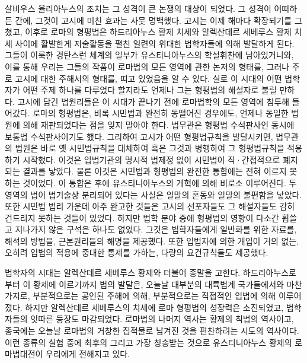 살비우스 율리아누스의 조치는 그 성격이 큰 논쟁의 대상이 되었다.
그 성격이 어떠하든 간에, 그것이 고시에 미친 효과는 사뭇 명백했다.
고시는 이제 해마다 확장되기를 그쳤고, 이후로
로마의 형평법은 하드리아누스 황제 치세와 알렉산데르 세베루스 황제 치세 사이에
활발한게 저술활동을 펼친 일련의 위대한 법학자들에 의해 발달하게 된다.
그들이 이룩한 경탄스런 체계의 일부가
유스티니아누스의 학설휘찬에
남아있거니와, 이를 통해 우리는 그들의 작품이 로마법의 모든 영역에 관한
논저의 형태를,
그러나 주로 고시에 대한 주해서의 형태를, 띠고 있었음을 알 수 있다.
실로 이 시대의 어떤 법학자가 어떤 주제 하나를 다루었다 할지라도
언제나 그는 형평법의 해설자로 불릴 만하다.
고시에 담긴 법원리들은 이 시대가 끝나기 전에 로마법학의 모든 영역에
침투해 들어갔다.
로마의 형평법은, 비록 시민법과 완전히 동떨어진 경우에도,
언제나 동일한 법원에 의해 재판되었다는 점을 잊지 말아야 한다.
법무관은 형평법 수석판사인 동시에 보통법 수석판사이기도 했다.
그리하여 고시가 어떤 형평법규칙을 발달시키면,
법무관의 법원은 바로 옛 시민법규칙을 대체하여 혹은 그것과 병행하여
그 형평법규칙을 적용하기 시작했다. 이것은
입법기관의 명시적 법제정 없이 시민법이 직^^b7간접적으로 폐지되는 결과를 낳았다.
물론 이것은 시민법과 형평법의 완전한 통합에는 전혀 이르지 못하는 것이었다.
이 통합은 후에 유스티니아누스의 개혁에 의해 비로소 이루어진다.
두 영역의 법이 법기술상 분리되어 있다는 사실은
일말의 혼동와 일말의 불편함을 낳았다. 또한
시민법 법리 가운데 아주 완고한 것들은 고시의 선포자들도 그 해설자들도
감히 건드리지 못하는 것들이 있었다.
하지만 법학 분야 중에
형평법의 영향이 다소간 휩쓸고 지나가지 않은 구석은 하나도 없었다.
그것은 법학자들에게 일반화를 위한 자료를,
해석의 방법을, 근본원리들의 해명을 제공했다. 또한
입법자에 의한 개입이 거의 없는,
오히려 입법의 적용에 중대한 통제를 가하는,
다량의 요건규칙들도 제공했다.

법학자의 시대는 알렉산데르 세베루스 황제와 더불어 종말을 고한다.
하드리아누스로부터 이 황제에 이르기까지 법의 발달은,
오늘날 대부분의 대륙법계 국가들에서와 마찬가지로,
부분적으로는 공인된 주해에 의해,
부분적으로는 직접적인 입법에 의해 이루어졌다.
하지만 알렉산데르 세베루스의 치세에 로마 형평법의 성장력은 소진되었고,
법학자들의 잇따른 등장도 마감되었다.
로마법의 나머지 역사는 황제의 칙법의 역사이고,
종국에는 오늘날 로마법의 거창한 집적물로 남겨진 것을 편찬하려는
시도의 역사이다.
이런 종류의 실험 중에 최후의 그리고 가장 칭송받는 것으로
유스티니아누스 황제의 로마법대전이 우리에게 전해지고 있다.

